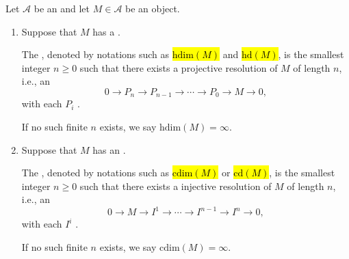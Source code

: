 \begin{definition} \label{definition:homological_cohomological_dimension_of_objects_in_abelian_categories_with_enough_projectives_injectives}
Let $\mathcal{A}$ be an  and let $M \in \mathcal{A}$ be an object.
\begin{enumerate}
    \item Suppose that $M$ has a .

    The , denoted by notations such as \hl{$\mathrm{hdim}(M)$} and \hl{$\mathrm{hd}(M)$}, is the smallest integer $n \geq 0$ such that there exists a projective resolution of $M$ of length $n$, i.e., an 
    $$ 0 \to P_n \to P_{n-1} \to \cdots \to P_0 \to M \to 0, $$
    with each $P_i$ . 

    If no such finite $n$ exists, we say $\mathrm{hdim}(M) = \infty$.

    \item Suppose that $M$ has an .

    The , denoted by notations such as \hl{$\mathrm{cdim}(M)$} or \hl{$\mathrm{cd}(M)$}, is the smallest integer $n \geq 0$ such that there exists a injective resolution of $M$ of length $n$, i.e., an 
    $$0 \to M \to I^1 \to \cdots \to I^{n-1} \to I^n \to 0, $$
    with each $I^i$ . 

    If no such finite $n$ exists, we say $\mathrm{cdim}(M) = \infty$.
\end{enumerate}
\end{definition}